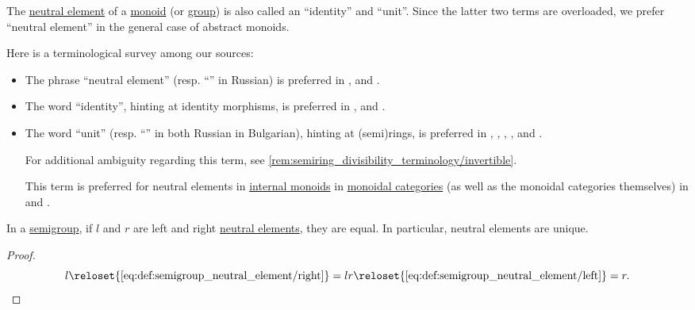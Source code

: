 \begin{remark}\label{rem:neutral_element_terminology}
  The \hyperref[def:semigroup_neutral_element]{neutral element} of a \hyperref[def:monoid]{monoid} (or \hyperref[def:group]{group}) is also called an \enquote{identity} and \enquote{unit}. Since the latter two terms are overloaded, we prefer \enquote{neutral element} in the general case of abstract monoids.

  Here is a terminological survey among our sources:
  \begin{itemize}
    \item The phrase \enquote{neutral element} (resp. \enquote{} in Russian) is preferred in
    \cite[7]{Perrone2024StartingCategoryTheory},
    \cite[80]{Тыртышников2017ОсновыАлгебры} and
    \cite[116]{БелоусовТкачёв2004ДискретнаяМатематика}.

    \item The word \enquote{identity}, hinting at identity morphisms, is preferred in
    \cite[1]{Golan1999Semirings},
    \cite[def. II.1.2(ii)]{Aluffi2009Algebra} and
    \cite[def. 1.2.1]{Bourbaki1998Algebra1to3}.

    \item The word \enquote{unit} (resp. \enquote{} in both Russian in Bulgarian), hinting at (semi)rings, is preferred in
    \cite[29]{Jacobson1985BasicAlgebraI},
    \cite[3]{Lang2002Algebra},
    \cite[18]{Курош1967ТеорияГрупп},
    \cite[135]{Кострикин2020АлгебраЧасть1},
    \cite[76]{ГеновМиховскиМоллов1991Алгебра} and
    \cite[372]{Обрешков1962ВисшаАлгебра}.

    For additional ambiguity regarding this term, see \cref{rem:semiring_divisibility_terminology/invertible}.

    This term is preferred for neutral elements in \hyperref[def:categorical_monoid]{internal monoids} in \hyperref[def:monoidal_category]{monoidal categories} (as well as the monoidal categories themselves) in
    \cite[ch. VII]{MacLane1998CategoryTheory} and
    \cite[def. 6.1.1; def. 6.2.1]{Perrone2024StartingCategoryTheory}.
  \end{itemize}
\end{remark}

\begin{proposition}\label{thm:semigroup_neutral_element_uniqueness}
  In a \hyperref[def:semigroup]{semigroup}, if \( l \) and \( r \) are left and right \hyperref[def:semigroup_neutral_element]{neutral elements}, they are equal. In particular, neutral elements are unique.
\end{proposition}
\begin{proof}
  \begin{equation*}
    l
    \reloset {\eqref{eq:def:semigroup_neutral_element/right}} =
    lr
    \reloset {\eqref{eq:def:semigroup_neutral_element/left}} =
    r.
  \end{equation*}
\end{proof}

